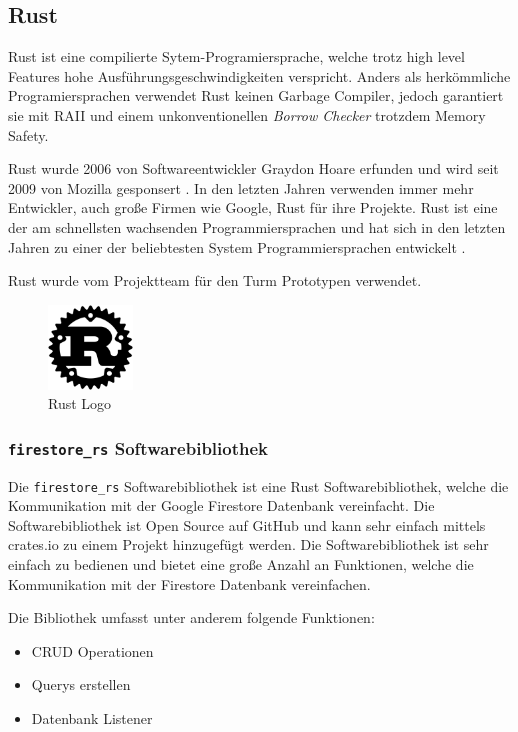 \subsection{Rust}
\label{sec:rust}

Rust ist eine compilierte Sytem-Programiersprache, welche trotz high level Features hohe Ausführungsgeschwindigkeiten verspricht. Anders als herkömmliche Programiersprachen verwendet Rust keinen Garbage Compiler, jedoch garantiert sie mit \ac{RAII} und einem unkonventionellen \textit{Borrow Checker} trotzdem Memory Safety.


Rust wurde 2006 von Softwareentwickler Graydon Hoare erfunden und wird seit 2009 von Mozilla gesponsert . In den letzten Jahren verwenden immer mehr Entwickler, auch große Firmen wie Google, Rust für ihre Projekte. Rust ist eine der am schnellsten wachsenden Programmiersprachen und hat sich in den letzten Jahren zu einer der beliebtesten System Programmiersprachen entwickelt .

Rust wurde vom Projektteam für den Turm Prototypen verwendet.

\begin{figure}[H]
    \centering
    \includegraphics[width=0.20\textwidth]{images/rust_logo.png}
    \caption{Rust Logo}
    \label{fig:rust_logo}
\end{figure}

\subsubsection{\texttt{firestore\_rs} Softwarebibliothek}
\label{sec:firestore_rs}

Die \texttt{firestore\_rs} Softwarebibliothek ist eine Rust Softwarebibliothek, welche die Kommunikation mit der Google Firestore Datenbank vereinfacht. Die Softwarebibliothek ist Open Source auf GitHub und kann sehr einfach mittels crates.io zu einem Projekt hinzugefügt werden. Die Softwarebibliothek ist sehr einfach zu bedienen und bietet eine große Anzahl an Funktionen, welche die Kommunikation mit der Firestore Datenbank vereinfachen.

Die Bibliothek umfasst unter anderem folgende Funktionen:
\begin{itemize}
    \item \ac{CRUD} Operationen
    \item Querys erstellen
    \item Datenbank Listener
\end{itemize}

